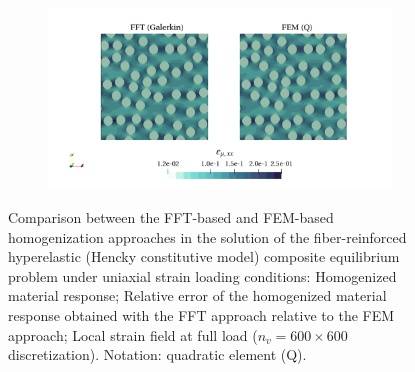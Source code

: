 \begin{figure}[hbt]
\begin{subfigure}[b]{0.49\textwidth}
    \caption{}
    \label{subfig:hencky_2D_normal_material_response_error}
  \end{subfigure}
  \begin{subfigure}[b]{\textwidth}
    \centering
    \includegraphics[width=\textwidth]{figures/hencky_2D_normal_strain_11}
    \caption{}
    \label{subfig:hencky_2D_normal_strain_11}
  \end{subfigure}
  \caption{Comparison between the FFT-based and FEM-based homogenization approaches in the
  solution of the fiber-reinforced hyperelastic (Hencky constitutive model) composite equilibrium problem under uniaxial
  strain loading conditions:  Homogenized material response;  Relative error of the homogenized material response obtained with the FFT approach relative to the FEM approach;  Local strain field at full load (\(n_v = 600 \times 600\)
  discretization). Notation: quadratic element (Q).}
\label{fig:hencky_mat_res_2D_normal}
\end{figure}

